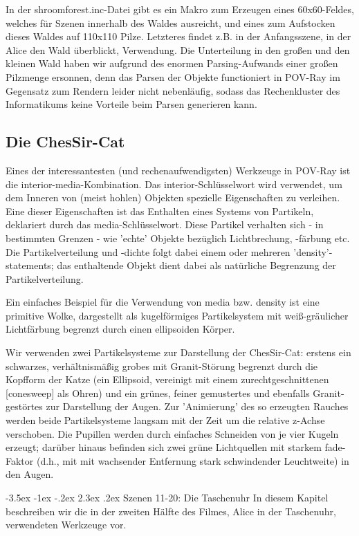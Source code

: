 \documentclass[twocolumn]{article}
\makeatletter
\renewcommand\section{\@startsection{section}{1}{\z@}%
                                      {-3.5ex \@plus -1ex \@minus -.2ex}%
                                      {2.3ex \@plus.2ex}%
                                      {\normalfont\large\bfseries}}
\makeatother
\begin{document}
In der shroomforest.inc-Datei gibt es ein Makro zum Erzeugen eines 60x60-Feldes, welches für Szenen innerhalb des Waldes ausreicht, und eines zum Aufstocken dieses Waldes auf 110x110 Pilze. Letzteres findet z.B. in der Anfangsszene, in der Alice den Wald überblickt, Verwendung.
Die Unterteilung in den großen und den kleinen Wald haben wir aufgrund des enormen Parsing-Aufwands einer großen Pilzmenge ersonnen, denn das Parsen der Objekte functioniert in POV-Ray im Gegensatz zum Rendern leider nicht nebenläufig, sodass das Rechenkluster des Informatikums keine Vorteile beim Parsen generieren kann.

\subsection{Die ChesSir-Cat}

Eines der interessantesten (und rechenaufwendigsten) Werkzeuge in POV-Ray ist die interior-media-Kombination. Das interior-Schlüsselwort wird verwendet, um dem Inneren von (meist hohlen) Objekten spezielle Eigenschaften zu verleihen. Eine dieser Eigenschaften ist das Enthalten eines Systems von Partikeln, deklariert durch das media-Schlüsselwort. Diese Partikel verhalten sich - in bestimmten Grenzen - wie 'echte' Objekte bezüglich Lichtbrechung, -färbung etc. Die Partikelverteilung und -dichte folgt dabei einem oder mehreren 'density'-statements; das enthaltende Objekt dient dabei als natürliche Begrenzung der Partikelverteilung.

Ein einfaches Beispiel für die Verwendung von media bzw. density ist eine primitive Wolke, dargestellt als kugelförmiges Partikelsystem mit weiß-gräulicher Lichtfärbung begrenzt durch einen ellipsoiden Körper.

Wir verwenden zwei Partikelsysteme zur Darstellung der ChesSir-Cat: erstens ein schwarzes, verhältnismäßig grobes mit Granit-Störung begrenzt durch die Kopfform der Katze (ein Ellipsoid, vereinigt mit einem zurechtgeschnittenen [conesweep] als Ohren) und ein grünes, feiner gemustertes und ebenfalls Granit-gestörtes zur Darstellung der Augen. Zur 'Animierung' des so erzeugten Rauches werden beide Partikelsysteme langsam mit der Zeit um die relative z-Achse verschoben. Die Pupillen werden durch einfaches Schneiden von je vier Kugeln erzeugt; darüber hinaus befinden sich zwei grüne Lichtquellen mit starkem fade-Faktor (d.h., mit mit wachsender Entfernung stark schwindender Leuchtweite) in den Augen.

\section{Szenen 11-20: Die Taschenuhr}
In diesem Kapitel beschreiben wir die in der zweiten Hälfte des Filmes, Alice in der Taschenuhr, verwendeten Werkzeuge vor.
\end{document}
